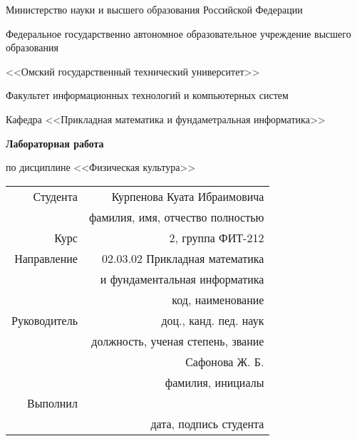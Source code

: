 \documentclass[14pt, a4paper]{article}
\begin{document}
    \thispagestyle{empty}

    \begin{center}
        Министерство науки и высшего образования Российской Федерации

        Федеральное государственно автономное образовательное учреждение высшего образования

        <<Омский государственный технический университет>>

        \vspace{1cm}
        Факультет информационных технологий и компьютерных систем

        Кафедра <<Прикладная математика и фундаметральная информатика>>

        \vspace{3cm}
        \textbf{Лабораторная работа}

        по дисциплине <<Физическая культура>>
    \end{center}
    
    \vspace{3cm}
    \begin{flushright}    
        \begin{tabular}{ r r }
            Студента & Курпенова Куата Ибраимовича \\
            \cline{2-2}
            & \tiny{фамилия, имя, отчество полностью} \\

            Курс & 2, группа ФИТ-212 \\
            \cline{2-2}
            Направление & 02.03.02 Прикладная математика \\
            \cline{2-2}
            & и фундаментальная информатика \\
            \cline{2-2}
            & \tiny{код, наименование} \\
            
            Руководитель & доц., канд. пед. наук \\
            \cline{2-2}
            & \tiny{должность, ученая степень, звание} \\
            & Сафонова Ж. Б. \\
            \cline{2-2}
            & \tiny{фамилия, инициалы} \\
            
            Выполнил & \\
            \cline{2-2}
            & \tiny{дата, подпись студента} \\
            
        \end{tabular}
    \end{flushright}
    
\end{document}
